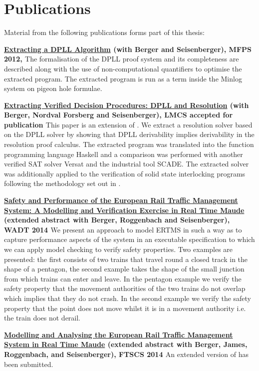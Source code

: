 \section{Publications}

Material from the following publications forms part of this thesis:

\textbf{\ul{Extracting a DPLL Algorithm} (with Berger and Seisenberger), MFPS 2012, \cite{AL12}}
The formalisation of the DPLL proof system and its completeness are described along with the use of non-computational quantifiers to optimise the extracted program. The extracted program is run as a term inside the Minlog system on pigeon hole formulae.


\textbf{\ul{Extracting Verified Decision Procedures: DPLL and Resolution} (with Berger, Nordval Forsberg and Seisenberger), LMCS accepted for publication \cite{AL14b}}
This paper is an extension of \cite{AL12}. We extract a resolution solver based on the DPLL solver by showing that DPLL derivability implies derivability in the resolution proof calculus. The extracted program was translated into the function programming language Haskell and a comparison was performed with another verified SAT solver Versat and the industrial tool SCADE. The extracted solver was additionally applied to the verification of solid state interlocking programs following the methodology set out in \cite{AL14a}.



\textbf{\ul{Safety and Performance of the European Rail Traffic Management System: A Modelling and Verification Exercise in Real Time Maude} (extended abstract with Berger, Roggenbach and Seisenberger), WADT 2014 \cite{AL14c}} We present an approach to model ERTMS in such a way as to capture performance aspects of the system in an executable specification to which we can apply model checking to verify safety properties. Two examples are presented: the first consists of two trains that travel round a closed track in the shape of a pentagon, the second example takes the shape of the small junction from which trains can enter and leave. In the pentagon example we verify the safety property that the movement authorities of the two trains do not overlap which implies that they do not crash. In the second example we verify the safety property that the point does not move whilst it is in a movement authority i.e. the train does not derail.

\textbf{\ul{Modelling and Analysing the European Rail Traffic Management System in Real Time Maude} (extended abstract with Berger, James, Roggenbach, and Seisenberger), FTSCS 2014 \cite{AL14d}} An extended version of \cite{AL14c} has been submitted.



